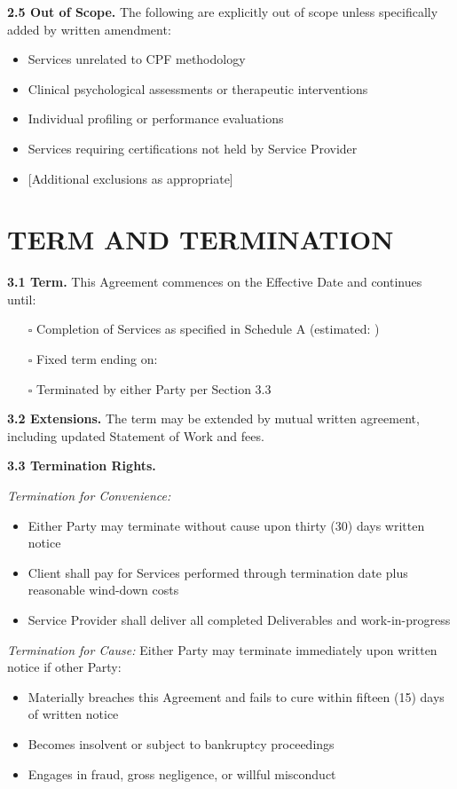 \documentclass[11pt,a4paper]{article}
\begin{document}
\textbf{2.5 Out of Scope.} The following are explicitly out of scope unless specifically added by written amendment:

\begin{itemize}
\item Services unrelated to CPF methodology
\item Clinical psychological assessments or therapeutic interventions
\item Individual profiling or performance evaluations
\item Services requiring certifications not held by Service Provider
\item {[Additional exclusions as appropriate]}
\end{itemize}

\section{TERM AND TERMINATION}

\textbf{3.1 Term.} This Agreement commences on the Effective Date and continues until:

\begin{itemize}
\item[$\square$] Completion of Services as specified in Schedule A (estimated: \underline{\hspace{4cm}})
\item[$\square$] Fixed term ending on: \underline{\hspace{6cm}}
\item[$\square$] Terminated by either Party per Section 3.3
\end{itemize}

\textbf{3.2 Extensions.} The term may be extended by mutual written agreement, including updated Statement of Work and fees.

\textbf{3.3 Termination Rights.}

\textit{Termination for Convenience:}
\begin{itemize}
\item Either Party may terminate without cause upon thirty (30) days written notice
\item Client shall pay for Services performed through termination date plus reasonable wind-down costs
\item Service Provider shall deliver all completed Deliverables and work-in-progress
\end{itemize}

\textit{Termination for Cause:}
Either Party may terminate immediately upon written notice if other Party:
\begin{itemize}
\item Materially breaches this Agreement and fails to cure within fifteen (15) days of written notice
\item Becomes insolvent or subject to bankruptcy proceedings
\item Engages in fraud, gross negligence, or willful misconduct
\end{itemize}
\end{document}
